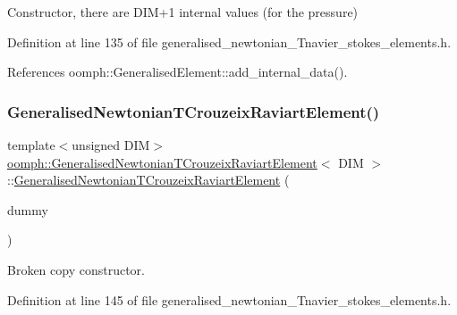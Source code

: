 Constructor, there are D\+I\+M+1 internal values (for the pressure) 



Definition at line 135 of file generalised\+\_\+newtonian\+\_\+\+Tnavier\+\_\+stokes\+\_\+elements.\+h.



References oomph\+::\+Generalised\+Element\+::add\+\_\+internal\+\_\+data().

\mbox{\label{classoomph_1_1GeneralisedNewtonianTCrouzeixRaviartElement_af661655ed2a7d84e5fc0d8ac239e5eff}} 
\subsubsection{\texorpdfstring{Generalised\+Newtonian\+T\+Crouzeix\+Raviart\+Element()}{GeneralisedNewtonianTCrouzeixRaviartElement()}\hspace{0.1cm}{\footnotesize\ttfamily [2/2]}}
{\footnotesize\ttfamily template$<$unsigned D\+IM$>$ \\
\hyperlink{classoomph_1_1GeneralisedNewtonianTCrouzeixRaviartElement}{oomph\+::\+Generalised\+Newtonian\+T\+Crouzeix\+Raviart\+Element}$<$ D\+IM $>$\+::\hyperlink{classoomph_1_1GeneralisedNewtonianTCrouzeixRaviartElement}{Generalised\+Newtonian\+T\+Crouzeix\+Raviart\+Element} (\begin{DoxyParamCaption}\item[{const \hyperlink{classoomph_1_1GeneralisedNewtonianTCrouzeixRaviartElement}{Generalised\+Newtonian\+T\+Crouzeix\+Raviart\+Element}$<$ D\+IM $>$ \&}]{dummy }\end{DoxyParamCaption})\hspace{0.3cm}{\ttfamily [inline]}}



Broken copy constructor. 



Definition at line 145 of file generalised\+\_\+newtonian\+\_\+\+Tnavier\+\_\+stokes\+\_\+elements.\+h.



